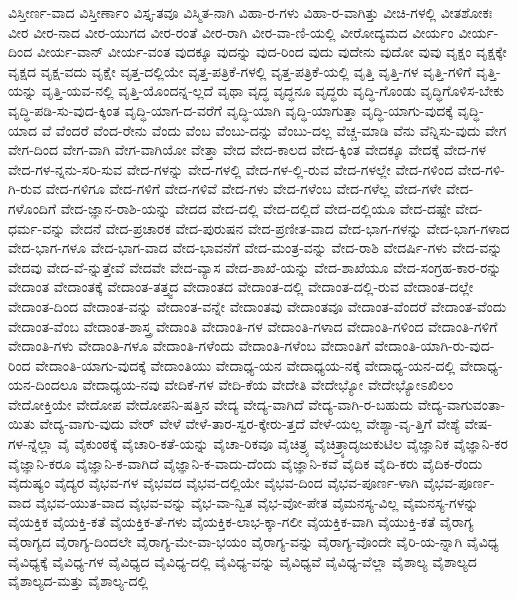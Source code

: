{ವಿಸ್ತೀರ್ಣ-ವಾದ
ವಿಸ್ತೀರ್ಣಾಂ
ವಿಸ್ತೃ-ತವೂ
ವಿಸ್ಮಿತ-ನಾಗಿ
ವಿಹಾ-ರ-ಗಳು
ವಿಹಾ-ರ-ವಾಗಿತ್ತು
ವೀಚಿ-ಗಳಲ್ಲಿ
ವೀತಶೋಕಃ
ವೀರ
ವೀರ-ನಾದ
ವೀರ-ಯುಗದ
ವೀರ-ರಂತೆ
ವೀರ-ರಾಗಿ
ವೀರ-ವಾ-ಣಿ-ಯಲ್ಲಿ
ವೀರೋದ್ಯಮದ
ವೀರ್ಯಂ
ವೀರ್ಯ-ದಿಂದ
ವೀರ್ಯ-ವಾನ್
ವೀರ್ಯ-ವಂತ
ವುದಕ್ಕೂ
ವುದನ್ನು
ವುದ-ರಿಂದ
ವುದು
ವುದೇನು
ವುದೋ
ವುವು
ವೃಕ್ಷಂ
ವೃಕ್ಷಕ್ಕೇ
ವೃಕ್ಷದ
ವೃಕ್ಷ-ವದು
ವೃಕ್ಷೇ
ವೃತ್ತ-ದಲ್ಲಿಯೇ
ವೃತ್ತ-ಪತ್ರಿಕೆ-ಗಳಲ್ಲಿ
ವೃತ್ತ-ಪತ್ರಿಕೆ-ಯಲ್ಲಿ
ವೃತ್ತಿ
ವೃತ್ತಿ-ಗಳ
ವೃತ್ತಿ-ಗಳಿಗೆ
ವೃತ್ತಿ-ಯನ್ನು
ವೃತ್ತಿ-ಯವ-ನಲ್ಲಿ
ವೃತ್ತಿ-ಯೊಂದನ್ನ-ಲ್ಲದೆ
ವೃಥಾ
ವೃದ್ಧ
ವೃದ್ಧನೂ
ವೃದ್ಧರು
ವೃದ್ಧಿ-ಗೊಂಡು
ವೃದ್ಧಿಗೊಳಿಸ-ಬೇಕು
ವೃದ್ಧಿ-ಪಡಿ-ಸು-ವುದ-ಕ್ಕಿಂತ
ವೃದ್ಧಿ-ಯಾಗ-ದ-ವರೆಗೆ
ವೃದ್ಧಿ-ಯಾಗಿ
ವೃದ್ಧಿ-ಯಾಗುತ್ತಾ
ವೃದ್ಧಿ-ಯಾಗು-ವುದಕ್ಕೆ
ವೃದ್ಧಿ-ಯಾದ
ವೆ
ವೆಂದರೆ
ವೆಂದ-ರೇನು
ವೆಂದು
ವೆಂಬ
ವೆಂಬು-ದನ್ನು
ವೆಂಬು-ದಲ್ಲ
ವೆಚ್ಚ-ಮಾಡಿ
ವೆನು
ವೆನ್ನಿಸು-ವುದು
ವೇಗ
ವೇಗ-ದಿಂದ
ವೇಗ-ವಾಗಿ
ವೇಗ-ವಾಗಿಯೋ
ವೇತ್ತಾ
ವೇದ
ವೇದ-ಕಾಲದ
ವೇದ-ಕ್ಕಿಂತ
ವೇದಕ್ಕೂ
ವೇದಕ್ಕೆ
ವೇದ-ಗಳ
ವೇದ-ಗಳ-ನ್ನನು-ಸರಿ-ಸುವ
ವೇದ-ಗಳನ್ನು
ವೇದ-ಗಳಲ್ಲಿ
ವೇದ-ಗಳ-ಲ್ಲಿ-ರುವ
ವೇದ-ಗಳಲ್ಲೇ
ವೇದ-ಗಳಿಂದ
ವೇದ-ಗಳಿ-ಗಿ-ರುವ
ವೇದ-ಗಳಿಗೂ
ವೇದ-ಗಳಿಗೆ
ವೇದ-ಗಳಿವೆ
ವೇದ-ಗಳು
ವೇದ-ಗಳೆಂಬ
ವೇದ-ಗಳೆಲ್ಲ
ವೇದ-ಗಳೇ
ವೇದ-ಗಳೊಂದಿಗೆ
ವೇದ-ಜ್ಞಾನ-ರಾಶಿ-ಯನ್ನು
ವೇದದ
ವೇದ-ದಲ್ಲಿ
ವೇದ-ದಲ್ಲಿದೆ
ವೇದ-ದಲ್ಲಿಯೂ
ವೇದ-ದಷ್ಟೇ
ವೇದ-ಧರ್ಮ-ವನ್ನು
ವೇದನೆ
ವೇದ-ಪ್ರಚಾರಕ
ವೇದ-ಪುರುಷನ
ವೇದ-ಪ್ರಣೀತ-ವಾದ
ವೇದ-ಭಾಗ-ಗಳನ್ನು
ವೇದ-ಭಾಗ-ಗಳಾದ
ವೇದ-ಭಾಗ-ಗಳೂ
ವೇದ-ಭಾಗ-ವಾದ
ವೇದ-ಭಾವನೆಗೆ
ವೇದ-ಮಂತ್ರ-ವನ್ನು
ವೇದ-ರಾಶಿ
ವೇದರ್ಷಿ-ಗಳು
ವೇದ-ವನ್ನು
ವೇದವು
ವೇದ-ವೆ-ನ್ನುತ್ತೇವೆ
ವೇದವೇ
ವೇದ-ವ್ಯಾಸ
ವೇದ-ಶಾಖೆ-ಯನ್ನು
ವೇದ-ಶಾಖೆಯೂ
ವೇದ-ಸಂಗ್ರಹ-ಕಾರ-ರನ್ನು
ವೇದಾಂತ
ವೇದಾಂತಕ್ಕೆ
ವೇದಾಂತ-ತತ್ತ್ವದ
ವೇದಾಂತದ
ವೇದಾಂತ-ದಲ್ಲಿ
ವೇದಾಂತ-ದಲ್ಲಿ-ರುವ
ವೇದಾಂತ-ದಲ್ಲೇ
ವೇದಾಂತ-ದಿಂದ
ವೇದಾಂತ-ವನ್ನು
ವೇದಾಂತ-ವನ್ನೇ
ವೇದಾಂತವು
ವೇದಾಂತವೂ
ವೇದಾಂತ-ವೆಂದರೆ
ವೇದಾಂತ-ವೆಂದು
ವೇದಾಂತ-ವೆಂಬ
ವೇದಾಂತ-ಶಾಸ್ತ್ರ
ವೇದಾಂತಿ
ವೇದಾಂತಿ-ಗಳ
ವೇದಾಂತಿ-ಗಳಾದ
ವೇದಾಂತಿ-ಗಳಿಂದ
ವೇದಾಂತಿ-ಗಳಿಗೆ
ವೇದಾಂತಿ-ಗಳು
ವೇದಾಂತಿ-ಗಳೂ
ವೇದಾಂತಿ-ಗಳೆಂದು
ವೇದಾಂತಿ-ಗಳೆಂಬ
ವೇದಾಂತಿಗೆ
ವೇದಾಂತಿ-ಯಾಗಿ-ರು-ವುದ-ರಿಂದ
ವೇದಾಂತಿ-ಯಾಗು-ವುದಕ್ಕೆ
ವೇದಾಂತಿಯು
ವೇದಾಧ್ಯ-ಯನ
ವೇದಾಧ್ಯಯ-ನಕ್ಕೆ
ವೇದಾಧ್ಯ-ಯನ-ದಲ್ಲಿ
ವೇದಾಧ್ಯ-ಯನ-ದಿಂದಲೂ
ವೇದಾಧ್ಯಯ-ನವು
ವೇದಿಕೆ-ಗಳ
ವೇದಿ-ಕೆಯ
ವೇದೇತಿ
ವೇದೇಭ್ಯೋ
ವೇದೇಭ್ಯೋಽಖಿಲಂ
ವೇದೋಕ್ತಿಯೇ
ವೇದೋಪ
ವೇದೋಪನಿ-ಷತ್ತಿನ
ವೇದ್ಯ
ವೇದ್ಯ-ವಾಗಿದೆ
ವೇದ್ಯ-ವಾಗಿ-ರ-ಬಹುದು
ವೇದ್ಯ-ವಾಗುವಂತಾ-ಯಿತು
ವೇದ್ಯ-ವಾಗು-ವುದು
ವೇರ್
ವೇಳೆ
ವೇಳೆ-ತಾರ-ಸ್ವರ-ಕ್ಕೇರು-ತ್ತದೆ
ವೇಳೆ-ಯಲ್ಲ
ವೇಶ್ಯಾ-ವೃ-ತ್ತಿಗೆ
ವೇಶ್ಯೆ
ವೇಷ-ಗಳ-ನ್ನೆಲ್ಲಾ
ವೈ
ವೈಕುಂಠಕ್ಕೆ
ವೈಚಾರಿ-ಕತೆ-ಯನ್ನು
ವೈಚಾ-ರಿಕವೂ
ವೈಚಿತ್ರ್ಯ
ವೈಚಿತ್ರ್ಯಾದೃಜುಕುಟಿಲ
ವೈಜ್ಞಾನಿಕ
ವೈಜ್ಞಾನಿ-ಕರ
ವೈಜ್ಞಾನಿ-ಕರೂ
ವೈಜ್ಞಾನಿ-ಕ-ವಾಗಿದೆ
ವೈಜ್ಞಾನಿ-ಕ-ವಾದು-ದೆಂದು
ವೈಜ್ಞಾನಿ-ಕವೆ
ವೈದಿಕ
ವೈದಿ-ಕರು
ವೈದಿಕ-ರೆಂದು
ವೈದುಷ್ಯಂ
ವೈದ್ಯರ
ವೈಭವ-ಗಳ
ವೈಭವದ
ವೈಭವ-ದಲ್ಲಿಯೇ
ವೈಭವ-ದಿಂದ
ವೈಭವ-ಪೂರ್ಣ-ಳಾಗಿ
ವೈಭವ-ಪೂರ್ಣ-ವಾದ
ವೈಭವ-ಯುತ-ವಾದ
ವೈಭವ-ವನ್ನು
ವೈಭ-ವಾ-ನ್ವಿತ
ವೈಭ-ವೋ-ಪೇತ
ವೈಮನಸ್ಯ-ವಿಲ್ಲ
ವೈಮನಸ್ಯ-ಗಳನ್ನು
ವೈಯಕ್ತಿಕ
ವೈಯಕ್ತಿ-ಕತೆ
ವೈಯಕ್ತಿಕ-ತೆ-ಗಳು
ವೈಯಕ್ತಿಕ-ಲಾಭ-ಕ್ಕಾ-ಗಲೀ
ವೈಯಕ್ತಿಕ-ವಾಗಿ
ವೈಯುಕ್ತಿ-ಕತೆ
ವೈರಾಗ್ಯ
ವೈರಾಗ್ಯದ
ವೈರಾಗ್ಯ-ದಿಂದಲೇ
ವೈರಾಗ್ಯ-ಮೇ-ವಾ-ಭಯಂ
ವೈರಾಗ್ಯ-ವನ್ನು
ವೈರಾಗ್ಯ-ವೊಂದೇ
ವೈರಿ-ಯ-ನ್ನಾಗಿ
ವೈವಿಧ್ಯ
ವೈವಿಧ್ಯಕ್ಕೆ
ವೈವಿಧ್ಯ-ಗಳ
ವೈವಿಧ್ಯದ
ವೈವಿಧ್ಯ-ದಲ್ಲಿ
ವೈವಿಧ್ಯ-ವನ್ನು
ವೈವಿಧ್ಯವೆ
ವೈವಿಧ್ಯ-ವೆಲ್ಲಾ
ವೈಶಾಲ್ಯ
ವೈಶಾಲ್ಯದ
ವೈಶಾಲ್ಯದ-ಮತ್ತು
ವೈಶಾಲ್ಯ-ದಲ್ಲಿ
}
